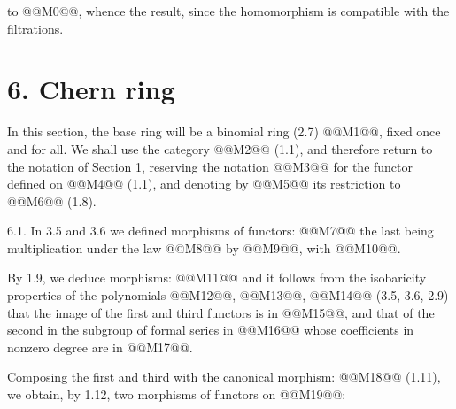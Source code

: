 to @@M0@@, whence the result, since the homomorphism is compatible with the filtrations.

\section*{6. Chern ring}

In this section, the base ring will be a binomial ring (2.7) @@M1@@, fixed once and for all. We shall use the category @@M2@@ (1.1), and therefore return to the notation of Section 1, reserving the notation @@M3@@ for the functor defined on @@M4@@ (1.1), and denoting by @@M5@@ its restriction to @@M6@@ (1.8).

6.1. In 3.5 and 3.6 we defined morphisms of functors:
@@M7@@
the last being multiplication under the law @@M8@@ by @@M9@@, with @@M10@@.

By 1.9, we deduce morphisms:
@@M11@@
and it follows from the isobaricity properties of the polynomials @@M12@@, @@M13@@, @@M14@@ (3.5, 3.6, 2.9) that the image of the first and third functors is in @@M15@@, and that of the second in the subgroup of formal series in @@M16@@ whose coefficients in nonzero degree are in @@M17@@.

Composing the first and third with the canonical morphism: @@M18@@ (1.11), we obtain, by 1.12, two morphisms of functors on @@M19@@:
